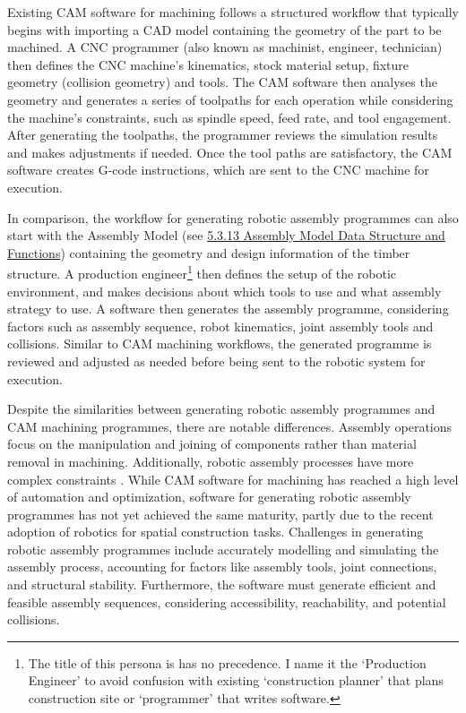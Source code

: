 Existing CAM software for machining follows a structured workflow that typically begins with importing a CAD model containing the geometry of the part to be machined. A CNC programmer (also known as machinist, engineer, technician) then defines the CNC machine’s kinematics, stock material setup, fixture geometry (collision geometry) and tools. The CAM software then analyses the geometry and generates a series of toolpaths for each operation while considering the machine's constraints, such as spindle speed, feed rate, and tool engagement. After generating the toolpaths, the programmer reviews the simulation results and makes adjustments if needed. Once the tool paths are satisfactory, the CAM software creates G-code instructions, which are sent to the CNC machine for execution.

In comparison, the workflow for generating robotic assembly programmes can also start with the Assembly Model (see \ul{5.3.13 Assembly Model Data Structure and Functions}) containing the geometry and design information of the timber structure. A production engineer\footnote{ The title of this persona is has no precedence. I name it the ‘Production Engineer’ to avoid confusion with existing ‘construction planner’ that plans construction site or ‘programmer’ that writes software.} then defines the setup of the robotic environment, and makes decisions about which tools to use and what assembly strategy to use. A software then generates the assembly programme, considering factors such as assembly sequence, robot kinematics, joint assembly tools and collisions. Similar to CAM machining workflows, the generated programme is reviewed and adjusted as needed before being sent to the robotic system for execution.

Despite the similarities between generating robotic assembly programmes and CAM machining programmes, there are notable differences. Assembly operations focus on the manipulation and joining of components rather than material removal in machining. Additionally, robotic assembly processes have more complex constraints \parencite{wangStateArtComputational2021}. While CAM software for machining has reached a high level of automation and optimization, software for generating robotic assembly programmes has not yet achieved the same maturity, partly due to the recent adoption of robotics for spatial construction tasks. Challenges in generating robotic assembly programmes include accurately modelling and simulating the assembly process, accounting for factors like assembly tools, joint connections, and structural stability. Furthermore, the software must generate efficient and feasible assembly sequences, considering accessibility, reachability, and potential collisions.

